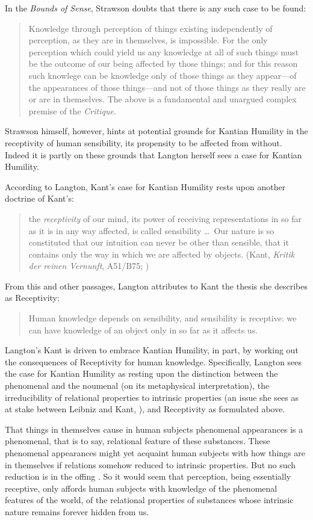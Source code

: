 In the \emph{Bounds of Sense}, Strawson doubts that there is any such case to be found:
\begin{quote}
	Knowledge through perception of things existing independently of perception, as they are in themselves, is impossible. For the only perception which could yield us any knowledge at all of such things must be the outcome of our being affected by those things; and for this reason such knowlege can be knowledge only of those things as they appear---of the appearances of those things---and not of those things as they really are or are in themselves. The above is a fundamental and unargued complex premise of the \emph{Critique}. \citep[250]{Strawson:1966kx}
\end{quote}
Strawson himself, however, hints at potential grounds for Kantian Humility in the receptivity of human sensibility, its propensity to be affected from without. Indeed it is partly on these grounds that Langton herself sees a case for Kantian Humility.

According to Langton, Kant's case for Kantian Humility rests upon another doctrine of Kant's:
\begin{quote}
	the \emph{receptivity} of our mind, its power of receiving representations in so far as it is in any way affected, is called sensibility \ldots\ Our nature is so constituted that our intuition can never be other than sensible, that it contains only the way in which we are affected by objects. (Kant, \emph{Kritik der reinen Vernunft}, A51/B75; \citealt[93]{Smith:1965jw})
\end{quote}
From this and other passages, Langton attributes to Kant the thesis she describes as Receptivity:
\begin{quote}
	Human knowledge depends on sensibility, and sensibility is receptive: we can have knowledge of an object only in so far as it affects us. \citep[125]{Langton:1998aa}
\end{quote}
Langton's Kant is driven to embrace Kantian Humility, in part, by working out the consequences of Receptivity for human knowledge. Specifically, Langton sees the case for Kantian Humility as resting upon the distinction between the phenomenal and the noumenal (on its metaphysical interpretation), the irreducibility of relational properties to intrinsic properties (an issue she sees as at stake between Leibniz and Kant, \citealt[chapters 4 and 5]{Langton:1998aa}), and Receptivity as formulated above. 

That things in themselves cause in human subjects phenomenal appearances is a phenomenal, that is to say, relational feature of these substances. These phenomenal appearances might yet acquaint human subjects with how things are in themselves if relations somehow reduced to intrinsic properties. But no such reduction is in the offing \citep[chapter 5]{Langton:1998aa}. So it would seem that perception, being essentially receptive, only affords human subjects with knowledge of the phenomenal features of the world, of the relational properties of substances whose intrinsic nature remains forever hidden from us.

